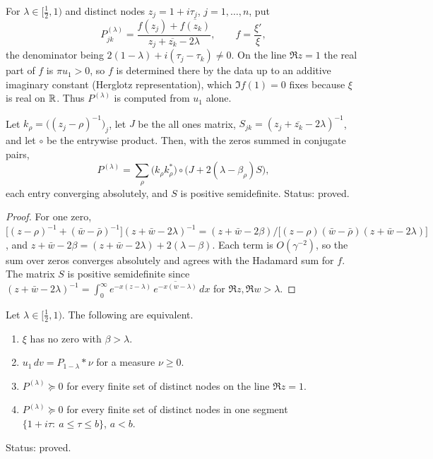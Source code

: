 For $\lambda\in[\tfrac12,1)$ and distinct nodes $z_j=1+i\tau_j$, $j=1,\dots,n$, put
\[
P^{(\lambda)}_{jk}=\frac{f(z_j)+\overline{f(z_k)}}{z_j+\overline{z_k}-2\lambda},\qquad f=\frac{\xi'}{\xi},
\]
the denominator being $2(1-\lambda)+i(\tau_j-\tau_k)\ne0$. On the line $\Re z=1$ the real part of $f$ is $\pi u_1>0$, so $f$ is determined there by the data up to an additive imaginary constant (Herglotz representation), which $\Im f(1)=0$ fixes because $\xi$ is real on $\mathbb{R}$. Thus $P^{(\lambda)}$ is computed from $u_1$ alone.

\begin{lemma}\label{cd:lem:gram}
Let $k_\rho=\bigl((z_j-\rho)^{-1}\bigr)_j$, let $J$ be the all ones matrix, $S_{jk}=(z_j+\overline{z_k}-2\lambda)^{-1}$, and let $\circ$ be the entrywise product. Then, with the zeros summed in conjugate pairs,
\[
P^{(\lambda)}=\sum_\rho\bigl(k_\rho k_\rho^{*}\bigr)\circ\bigl(J+2(\lambda-\beta_\rho)S\bigr),
\]
each entry converging absolutely, and $S$ is positive semidefinite. Status: proved.
\end{lemma}

\begin{proof}
For one zero, $\bigl[(z-\rho)^{-1}+(\bar w-\bar\rho)^{-1}\bigr](z+\bar w-2\lambda)^{-1}=(z+\bar w-2\beta)\big/\bigl[(z-\rho)(\bar w-\bar\rho)(z+\bar w-2\lambda)\bigr]$, and $z+\bar w-2\beta=(z+\bar w-2\lambda)+2(\lambda-\beta)$. Each term is $O(\gamma^{-2})$, so the sum over zeros converges absolutely and agrees with the Hadamard sum for $f$. The matrix $S$ is positive semidefinite since $(z+\bar w-2\lambda)^{-1}=\int_0^\infty e^{-x(z-\lambda)}\,\overline{e^{-x(w-\lambda)}}\,dx$ for $\Re z,\Re w>\lambda$.
\end{proof}

\begin{theorem}\label{cd:thm:pick}
Let $\lambda\in[\tfrac12,1)$. The following are equivalent.
\begin{enumerate}
\item[(i)] $\xi$ has no zero with $\beta>\lambda$.
\item[(ii)] $u_1\,dv=P_{1-\lambda}*\nu$ for a measure $\nu\ge0$.
\item[(iii)] $P^{(\lambda)}\succeq0$ for every finite set of distinct nodes on the line $\Re z=1$.
\item[(iv)] $P^{(\lambda)}\succeq0$ for every finite set of distinct nodes in one segment $\{1+i\tau:\ a\le\tau\le b\}$, $a<b$.
\end{enumerate}
Status: proved.
\end{theorem}

